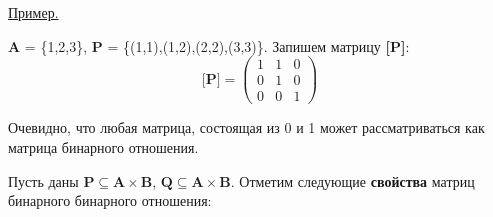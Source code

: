 \documentclass[12pt, a4paper, oneside]{article}
\theoremstyle{plain} %
\theoremstyle{definition}
\newcommand{\indef}[1]{\textbf{ \color{dark_red} #1}}
\begin{document}
\underline{Пример.}\par

\textbf{A} = \{1,2,3\}, \hspace{2mm} \textbf{P} = \{(1,1),(1,2),(2,2),(3,3)\}. Запишем матрицу \textbf{[P]}: \[\textbf{[P]} =
\begin{pmatrix}
1 & 1 & 0\\
0 & 1 & 0\\
0 & 0 & 1
\end{pmatrix}\]

Очевидно, что любая матрица, состоящая из 0 и 1 может рассматриваться как матрица бинарного отношения. \par 

Пусть даны $\textbf{P} \subseteq \textbf{A} \times \textbf{B}$, $\textbf{Q} \subseteq \textbf{A} \times \textbf{B}$. Отметим следующие \indef{свойства} матриц бинарного бинарного отношения:
\end{document}
